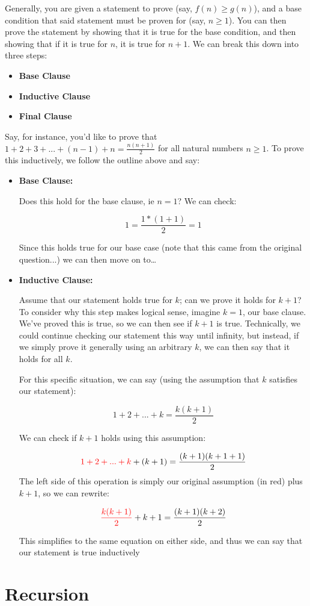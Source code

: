 \documentclass[12pt]{article}
\begin{document}
Generally, you are given a statement to prove (say, $f(n)\geq g(n)$), and a base condition that said statement must be proven for (say, $n\geq 1$). You can then prove the statement by showing that it is true for the base condition, and then showing that if it is true for $n$, it is true for $n+1$. We can break this down into three steps:

\begin{itemize}
    \item \textbf{Base Clause}
    \item \textbf{Inductive Clause}
    \item \textbf{Final Clause}
\end{itemize}

Say, for instance, you'd like to prove that $1+2+3+...+(n-1)+n = \frac{n(n+1)}{2}$ for all natural numbers $n\geq 1$. To prove this inductively, we follow the outline above and say:

\begin{itemize}
    \item \textbf{Base Clause:}
    
    Does this hold for the base clause, ie $n = 1$? We can check:
    
    \[
        1 = \frac{1*(1+1)}{2} = 1
    \]

    Since this holds true for our base case (note that this came from the original question...) we can then move on to\dots

    \item \textbf{Inductive Clause:}
    
    Assume that our statement holds true for $k$; can we prove it holds for $k+1$? To consider why this step makes logical sense, imagine $k=1$, our base clause. We've proved this is true, so we can then see if $k+1$ is true. Technically, we could continue checking our statement this way until infinity, but instead, if we simply prove it generally using an arbitrary $k$, we can then say that it holds for all $k$.

    For this specific situation, we can say (using the assumption that $k$ satisfies our statement):

    \[
      1 + 2 + ... + k = \frac{k(k+1)}{2}  
    \]

    We can check if $k+1$ holds using this assumption:

\[
    \textcolor{red}{1 + 2 + ... + k }+ (k+1) = \frac{(k+1)(k+1+1)}{2}
\]
The left side of this operation is simply our original  assumption (in red) plus $k+1$, so we can rewrite:


\[
   \textcolor{red}{\frac{k(k+1)}{2}} +k+1= \frac{(k+1)(k+2)}{2}
\]

This simplifies to the same equation on either side, and thus we can say that our statement is true inductively

\end{itemize}

\section{Recursion}
\end{document}
